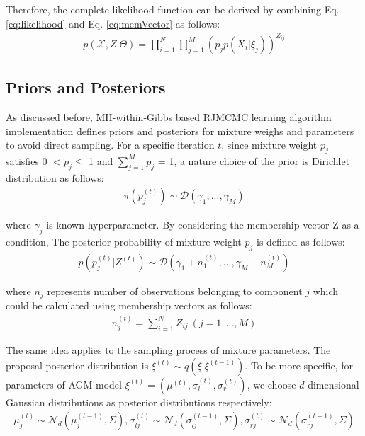 \documentclass[conference]{IEEEtran}
\begin{document}
Therefore, the complete likelihood function can be derived by combining Eq. \eqref{eq:likelihood} and Eq. \eqref{eq:memVector} as follows:
\begin{align}
p(\mathcal{X}, Z|\Theta) = \prod_{i=1}^{N}\prod_{j=1}^{M}(p_jp(X_i|\xi_j))^{Z_{ij}}
\label{eq:compPdf}
\end{align}

\subsection{Priors and Posteriors}
As discussed before, MH-within-Gibbs based RJMCMC learning algorithm implementation defines priors and posteriors for mixture weighs and parameters to avoid direct sampling. For a specific iteration $t$, since mixture weight $p_j$ satisfies 0 $< p_j \leq$ 1 and $\sum_{j=1}^Mp_j$ = 1, a nature choice of the prior is Dirichlet distribution\cite{b10} as follows:
\begin{align}
\pi(p_j^{(t)}) \sim \mathcal{D}(\gamma_1,...,\gamma_M )
\label{eq:priorWeight}
\end{align}

where $\gamma_j$ is known hyperparameter. By considering the membership vector Z as a condition, The posterior probability of mixture weight $p_j$ is defined as follows:
\begin{align}
p(p_j^{(t)}|Z^{(t)}) \sim \mathcal{D}(\gamma_1 + n_1^{(t)},...,\gamma_M + n_M^{(t)})
\label{eq:posterWeight}
\end{align}

where $n_j$ represents number of observations belonging to component $j$ which could be calculated using membership vectors as follows:
\begin{align}
n_j^{(t)} = \sum_{i=1}^NZ_{ij}\ (j = 1,...,M) 
\label{eq:nj}
\end{align}

The same idea applies to the sampling process of mixture parameters. The proposal posterior distribution is  $\xi^{(t)} \sim q(\xi|\xi^{(t-1)})$. To be more specific, for parameters of AGM model $\xi^{(t)} = (\mu^{(t)}, \sigma_{l}^{(t)}, \sigma_{r}^{(t)})$, we choose $d$-dimensional Gaussian distributions as posterior distributions respectively:
\begin{align}
\mu_j^{(t)} \sim \mathcal{N}_d(\mu_j^{(t-1)},\Sigma),
\sigma_{lj}^{(t)} \sim \mathcal{N}_d(\sigma_{lj}^{(t-1)},\Sigma),
\sigma_{rj}^{(t)} \sim \mathcal{N}_d(\sigma_{rj}^{(t-1)},\Sigma)
\label{eq:posters}
\end{align}
\end{document}
